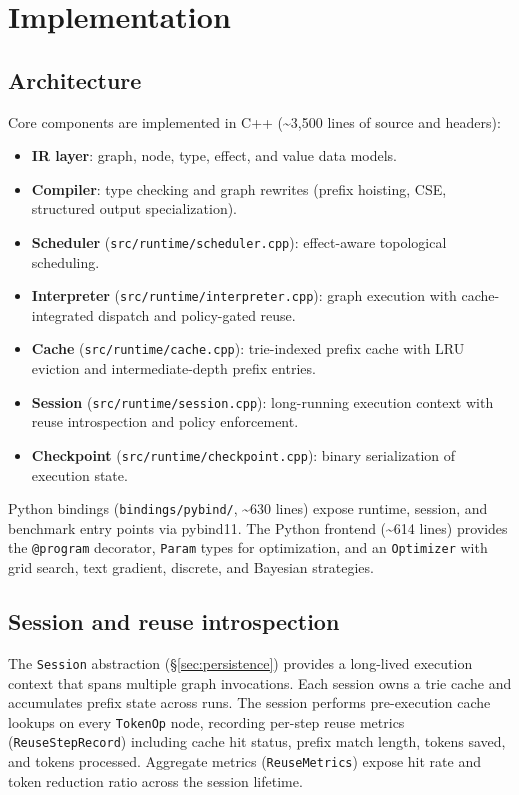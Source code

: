 \documentclass[10pt,twocolumn]{article}
\begin{document}
\section{Implementation}

\subsection{Architecture}
Core components are implemented in C++ (\textasciitilde3,500 lines of source and headers):
\begin{itemize}[leftmargin=*]
  \item \textbf{IR layer}: graph, node, type, effect, and value data models.
  \item \textbf{Compiler}: type checking and graph rewrites (prefix hoisting, CSE, structured output specialization).
  \item \textbf{Scheduler} (\texttt{src/runtime/scheduler.cpp}): effect-aware topological scheduling.
  \item \textbf{Interpreter} (\texttt{src/runtime/interpreter.cpp}): graph execution with cache-integrated dispatch and policy-gated reuse.
  \item \textbf{Cache} (\texttt{src/runtime/cache.cpp}): trie-indexed prefix cache with LRU eviction and intermediate-depth prefix entries.
  \item \textbf{Session} (\texttt{src/runtime/session.cpp}): long-running execution context with reuse introspection and policy enforcement.
  \item \textbf{Checkpoint} (\texttt{src/runtime/checkpoint.cpp}): binary serialization of execution state.
\end{itemize}

Python bindings (\texttt{bindings/pybind/}, \textasciitilde630 lines) expose runtime, session, and benchmark entry points via pybind11. The Python frontend (\textasciitilde614 lines) provides the \texttt{@program} decorator, \texttt{Param} types for optimization, and an \texttt{Optimizer} with grid search, text gradient, discrete, and Bayesian strategies.

\subsection{Session and reuse introspection}
The \texttt{Session} abstraction (\S\ref{sec:persistence}) provides a long-lived execution context that spans multiple graph invocations. Each session owns a trie cache and accumulates prefix state across runs. The session performs pre-execution cache lookups on every \texttt{TokenOp} node, recording per-step reuse metrics (\texttt{ReuseStepRecord}) including cache hit status, prefix match length, tokens saved, and tokens processed. Aggregate metrics (\texttt{ReuseMetrics}) expose hit rate and token reduction ratio across the session lifetime.
\end{document}
